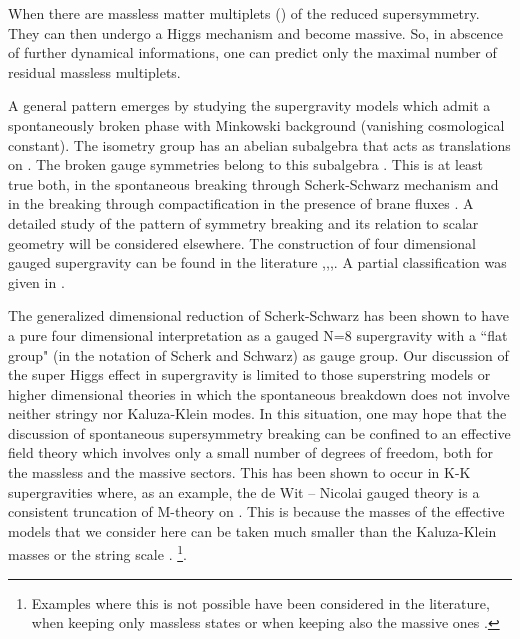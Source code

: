 \documentclass[a4paper,12pt]{article}
\begin{document}
When \coordHE{} there are  massless matter multiplets (\coordHE{}) of the reduced \coordHE{} supersymmetry.
 They  can then undergo a Higgs mechanism and become massive. So, in abscence of further dynamical informations,
  one can predict only the maximal number of residual massless multiplets.

A general pattern emerges by studying the supergravity models which admit a spontaneously broken phase with
 Minkowski background (vanishing cosmological constant). The  isometry  group \coordHE{} has an abelian subalgebra
  that acts as translations on \coordHE{}. The broken  gauge symmetries  belong to this subalgebra \cite{cgp,fgp,tz}.
   This is at least true both, in the spontaneous breaking through Scherk-Schwarz \cite{ss,css} mechanism and in
    the breaking \coordHE{}
 \cite{fp,kst} through compactification in the presence of  brane fluxes \cite{ps,tv,ma,cklt,gkp}. A detailed
 study of the pattern of symmetry breaking and its relation to scalar geometry will be considered elsewhere.
The construction of four dimensional gauged supergravity can be
found in the literature \cite{hw1},\cite{dwn},\cite{hu},\cite{hw}. A
partial classification  was given in \cite{cfgtt}.

The generalized dimensional reduction of  Scherk-Schwarz  has been
shown to have a pure four dimensional interpretation as a gauged
N=8 supergravity \cite{adfl} with a ``flat group" (in the notation
of Scherk and Schwarz) as gauge group. Our discussion of the super
Higgs effect in supergravity  is limited to those
 superstring models or higher dimensional theories in which the spontaneous breakdown does not involve neither
 stringy nor Kaluza-Klein modes. In this situation,  one may hope that the discussion of spontaneous
  supersymmetry breaking can be
 confined to an effective field theory which involves only a small number of degrees of freedom,
  both for the massless and the massive sectors. 
This has been shown to occur in K-K supergravities where, as an example, the de Wit -- Nicolai gauged \coordHE{} theory
is a consistent truncation of M-theory on \coordHE{} \cite{dwn2}.
This is because the masses of the effective models
  that we consider here
  can be taken much smaller than the Kaluza-Klein masses or the string scale \cite{fp}.  \footnote{Examples
 where this is not possible have been considered in the literature, when keeping only  massless states \cite{dlp,bkl}
 or when keeping also
  the massive ones \cite{kk}.}.
\end{document}
